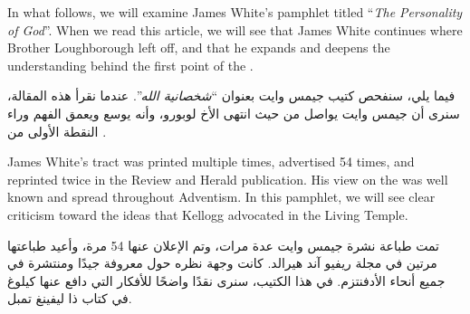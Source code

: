 



In what follows, we will examine James White’s pamphlet titled “\textit{The Personality of God}”. When we read this article, we will see that James White continues where Brother Loughborough left off, and that he expands and deepens the understanding behind the first point of the .


فيما يلي، سنفحص كتيب جيمس وايت بعنوان “\textit{شخصانية الله}”. عندما نقرأ هذه المقالة، سنرى أن جيمس وايت يواصل من حيث انتهى الأخ لوبورو، وأنه يوسع ويعمق الفهم وراء النقطة الأولى من .


James White’s tract was printed multiple times, advertised 54 times, and reprinted twice in the Review and Herald publication. His view on the  was well known and spread throughout Adventism. In this pamphlet, we will see clear criticism toward the ideas that Kellogg advocated in the Living Temple.


تمت طباعة نشرة جيمس وايت عدة مرات، وتم الإعلان عنها 54 مرة، وأعيد طباعتها مرتين في مجلة ريفيو آند هيرالد. كانت وجهة نظره حول  معروفة جيدًا ومنتشرة في جميع أنحاء الأدفنتزم. في هذا الكتيب، سنرى نقدًا واضحًا للأفكار التي دافع عنها كيلوغ في كتاب ذا ليفينغ تمبل.


